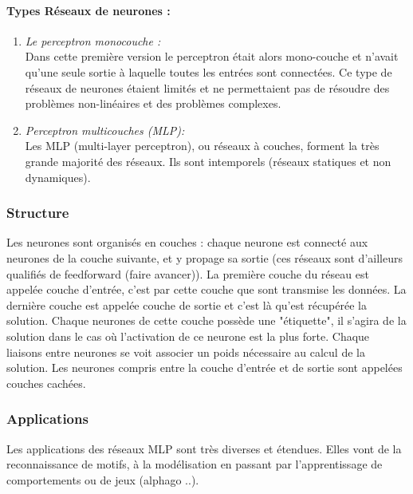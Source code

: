 \documentclass{article}
\begin{document}
			\paragraph{Types Réseaux de neurones :}
				\begin{enumerate}
					\item \emph{Le perceptron monocouche :} \\Dans cette première version le perceptron était alors mono-couche et n'avait qu'une seule sortie à laquelle toutes les entrées sont connectées. Ce type de réseaux de neurones étaient limités et ne permettaient pas de résoudre des problèmes non-linéaires et des problèmes complexes.
					\item \emph{Perceptron multicouches (MLP):} \\Les MLP (multi-layer perceptron), ou réseaux à couches, forment la très grande majorité des réseaux. Ils sont intemporels (réseaux statiques et non dynamiques).
				\end{enumerate}
		\subsubsection{Structure}
			Les neurones sont organisés en couches : chaque neurone est connecté aux neurones de la couche suivante, et y propage sa sortie (ces réseaux sont d'ailleurs qualifiés de feedforward (faire avancer)). La première couche du réseau est appelée couche d'entrée, c'est par cette couche que sont transmise les données. La dernière couche est appelée couche de sortie et c'est là qu'est récupérée la solution. Chaque neurones de cette couche possède une "étiquette", il s'agira de la solution dans le cas où l'activation de ce neurone est la plus forte. Chaque liaisons entre neurones se voit associer un poids nécessaire au calcul de la solution. Les neurones compris entre la couche d'entrée et de sortie sont appelées couches cachées.
		\subsubsection{Applications}
			Les applications des réseaux MLP sont très diverses et étendues. Elles vont de la reconnaissance de motifs, à la modélisation en passant par l'apprentissage de comportements ou de jeux (alphago ..).
\end{document}
